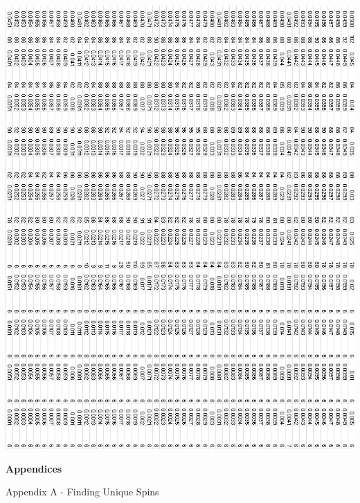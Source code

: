 \documentclass{article}
\begin{document}
\pagebreak
\begin{center}
 \includegraphics[keepaspectratio,scale=0.85]{005to000RSpinChart.png}
\end{center}
\pagebreak


\begin{center}
\LARGE\textbf{Appendices} \\
\end{center}
\Large
Appendix A - Finding Unique Spins
\large
\end{document}
